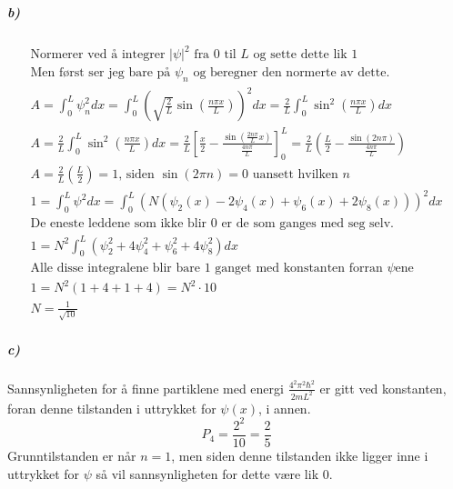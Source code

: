 \documentclass[11pt, A4paper,norsk]{article}
\begin{document}
			\subparagraph{b)}
				\begin{gather*}
\text{Normerer ved å integrer $|\psi|^2$ fra $0$ til $L$ og sette dette lik $1$} \\
\text{Men først ser jeg bare på $\psi_n$ og beregner den normerte av dette.} \\
A = \int_{0}^{L} \psi_n^2 dx = \int_{0}^{L} \left( \sqrt{\frac{2}{L}} \sin\left( \frac{n \pi x}{L} \right) \right)^2 dx = \frac{2}{L} \int_{0}^{L} \sin^2\left( \frac{n \pi x}{L} \right) dx \\
A = \frac{2}{L} \int_{0}^{L} \sin^2\left( \frac{n \pi x}{L} \right) dx = \frac{2}{L} \left[ \frac{x}{2} - \frac{\sin\left( \frac{2 n \pi}{L} x \right)}{\frac{4 n \pi}{L}} \right]_{0}^{L} = \frac{2}{L} \left( \frac{L}{2} - \frac{\sin\left( 2 n \pi \right)}{\frac{4 n \pi}{L}} \right) \\
A = \frac{2}{L} \left( \frac{L}{2} \right) = 1 \text{, siden $\sin(2 \pi n) = 0$ uansett hvilken $n$} \\
1 = \int_{0}^{L} \psi^2 dx = \int_{0}^{L} \left( N \left( \psi_2(x) - 2 \psi_4(x) + \psi_6(x) + 2 \psi_8(x) \right) \right)^2 dx \\
\text{De eneste leddene som ikke blir $0$ er de som ganges med seg selv.} \\
1 = N^2 \int_{0}^{L} \left( \psi_2^2 + 4 \psi_4^2 + \psi_6^2 + 4 \psi_8^2 \right) dx \\
\text{Alle disse integralene blir bare $1$ ganget med konstanten forran $\psi$ene} \\
1 = N^2 \left( 1 + 4 + 1 + 4 \right) = N^2 \cdot 10 \\
N = \frac{1}{\sqrt{10}}
				\end{gather*}












			\subparagraph{c)}
				\begin{flushleft}
Sannsynligheten for å finne partiklene med energi $\frac{4^2 \pi^2 \hbar^2}{2 m L^2}$ er gitt ved konstanten, foran denne tilstanden i uttrykket for $\psi(x)$, i annen.
$$P_4 = \frac{2^2}{10} = \frac{2}{5}$$
Grunntilstanden er når $n = 1$, men siden denne tilstanden ikke ligger inne i uttrykket for $\psi$ så vil sannsynligheten for dette være lik $0$.
				\end{flushleft}
\end{document}
